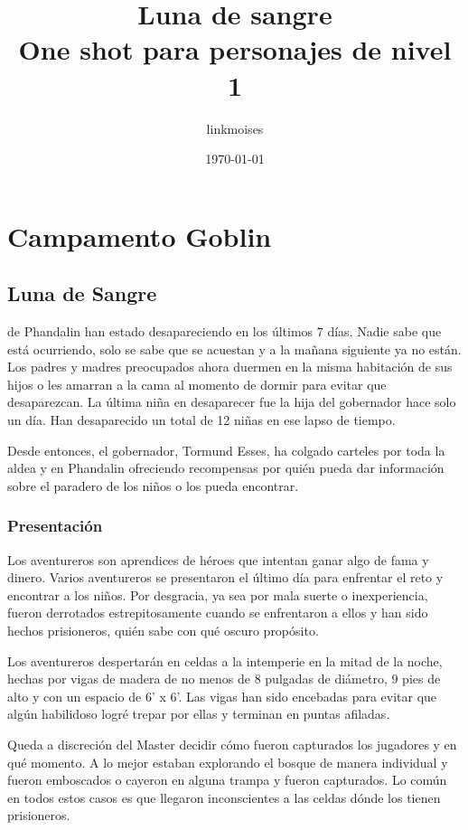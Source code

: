 \documentclass[10pt,twoside,twocolumn,openany]{dndbook}
\title{Luna de sangre\\
\large One shot para personajes de nivel 1}
\author{linkmoises}
\date{\today}
\begin{document}
\frontmatter

\maketitle

\mainmatter

\part*{Campamento Goblin}

\chapter*{Luna de Sangre}

 de Phandalin han estado desapareciendo en los últimos 7 días. Nadie sabe que está ocurriendo, solo se sabe que se acuestan y a la mañana siguiente ya no están. Los padres y madres preocupados ahora duermen en la misma habitación de sus hijos o les amarran a la cama al momento de dormir para evitar que desaparezcan. La última niña en desaparecer fue la hija del gobernador hace solo un día. Han desaparecido un total de 12 niñas en ese lapso de tiempo.

Desde entonces, el gobernador, Tormund Esses, ha colgado carteles por toda la aldea y en Phandalin ofreciendo recompensas por quién pueda dar información sobre el paradero de los niños o los pueda encontrar.

\section{Presentación}

Los aventureros son aprendices de héroes que intentan ganar algo de fama y dinero. Varios aventureros se presentaron el último día para enfrentar el reto y encontrar a los niños. Por desgracia, ya sea por mala suerte o inexperiencia, fueron derrotados estrepitosamente cuando se enfrentaron a ellos y han sido hechos prisioneros, quién sabe con qué oscuro propósito.

Los aventureros despertarán en celdas a la intemperie en la mitad de la noche, hechas por vigas de madera de no menos de 8 pulgadas de diámetro, 9 pies de alto y con un espacio de 6' x 6'. Las vigas han sido encebadas para evitar que algún habilidoso logré trepar por ellas y terminan en puntas afiladas.

Queda a discreción del Master decidir cómo fueron capturados los jugadores y en qué momento. A lo mejor estaban explorando el bosque de manera individual y fueron emboscados o cayeron en alguna trampa y fueron capturados. Lo común en todos estos casos es que llegaron inconscientes a las celdas dónde los tienen prisioneros.
\end{document}
